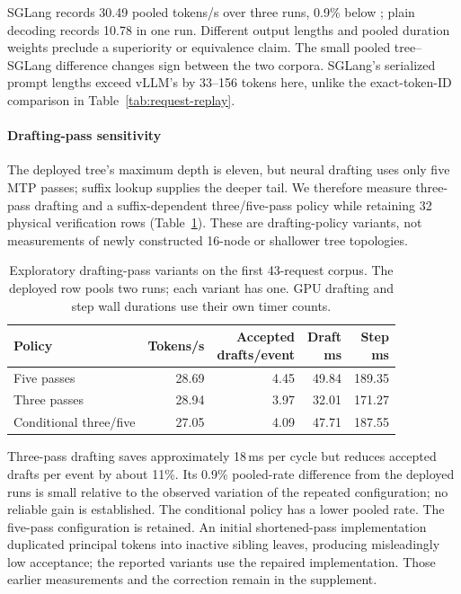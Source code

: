 SGLang records 30.49 pooled tokens/s over three runs, 0.9\% below \sys{}; plain decoding records 10.78 in one run. Different output lengths and pooled duration weights preclude a superiority or equivalence claim. The small pooled tree--SGLang difference changes sign between the two corpora. SGLang's serialized prompt lengths exceed vLLM's by 33--156 tokens here, unlike the exact-token-ID comparison in Table~\ref{tab:request-replay}.

\paragraph{Drafting-pass sensitivity}
The deployed tree's maximum depth is eleven, but neural drafting uses only five MTP passes; suffix lookup supplies the deeper tail. We therefore measure three-pass drafting and a suffix-dependent three/five-pass policy while retaining 32 physical verification rows (Table~\ref{tab:drafting-passes}). These are drafting-policy variants, not measurements of newly constructed 16-node or shallower tree topologies.

\begin{table}[t]
\caption{Exploratory drafting-pass variants on the first 43-request corpus. The deployed row pools two runs; each variant has one. GPU drafting and step wall durations use their own timer counts.}
\label{tab:drafting-passes}
\centering\small
\setlength{\tabcolsep}{3pt}
\begin{tabular}{@{}lrrrr@{}}
\toprule
Policy & Tokens/s & \shortstack{Accepted\\drafts/event} & \shortstack{Draft\\ms} & \shortstack{Step\\ms} \\
\midrule
Five passes & 28.69 & 4.45 & 49.84 & 189.35 \\
Three passes & 28.94 & 3.97 & 32.01 & 171.27 \\
Conditional three/five & 27.05 & 4.09 & 47.71 & 187.55 \\
\bottomrule
\end{tabular}
\end{table}

Three-pass drafting saves approximately 18\,ms per cycle but reduces accepted drafts per event by about 11\%. Its 0.9\% pooled-rate difference from the deployed runs is small relative to the observed variation of the repeated configuration; no reliable gain is established. The conditional policy has a lower pooled rate. The five-pass configuration is retained. An initial shortened-pass implementation duplicated principal tokens into inactive sibling leaves, producing misleadingly low acceptance; the reported variants use the repaired implementation. Those earlier measurements and the correction remain in the supplement.
